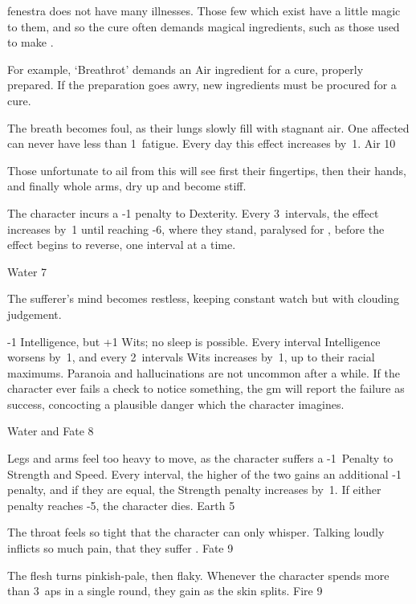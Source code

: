 \begin{multicols}{2}

\noindent
\Gls{fenestra} does not have many illnesses.
Those few which exist have a little magic to them, and so the cure often demands magical \glspl{ingredient}, such as those used to make .

For example, `Breathrot' demands an Air \gls{ingredient} for a cure, properly prepared.
If the preparation goes awry, new \glspl{ingredient} must be procured for a cure.

%
  {
    The breath becomes foul, as their lungs slowly fill with stagnant air.
    One affected can never have less than 1~\gls{fatigue}.
    Every day this effect increases by~1.
  }%
  {Air}%
  {10}

%
  {
    Those unfortunate to ail from this will see first their fingertips, then their hands, and finally whole arms, dry up and become stiff.

    The character incurs a -1 penalty to Dexterity.
    Every 3~\glspl{interval}, the effect increases by~1 until reaching -6, where they stand, paralysed for , before the effect begins to reverse, one \gls{interval} at a time.
  }%
  {Water}%
  {7}

%
  {The sufferer's mind becomes restless, keeping constant watch but with clouding judgement.

    -1 Intelligence, but +1 Wits; no sleep is possible.
    Every \gls{interval} Intelligence worsens by~1, and every 2~\glspl{interval} Wits increases by~1, up to their racial maximums.%
    Paranoia and hallucinations are not uncommon after a while.
    If the character ever fails a check to notice something, the \gls{gm} will report the failure as success, concocting a plausible danger which the character imagines.}%
  {Water and Fate}%
  {8}

%
  {Legs and arms feel too heavy to move, as the character suffers a -1~Penalty to Strength and Speed.
  Every \gls{interval}, the higher of the two gains an additional -1 penalty, and if they are equal, the Strength penalty increases by~1.
  If either penalty reaches -5, the character dies.}%
  {Earth}%
  {5}

%
  {The throat feels so tight that the character can only whisper.
  Talking loudly inflicts so much pain, that they suffer .}%
  {Fate}%
  {9}

%
  {The flesh turns pinkish-pale, then flaky.
  Whenever the character spends more than 3~\glspl{ap} in a single round, they gain  as the skin splits.}%
  {Fire}%
  {9}

\end{multicols}
